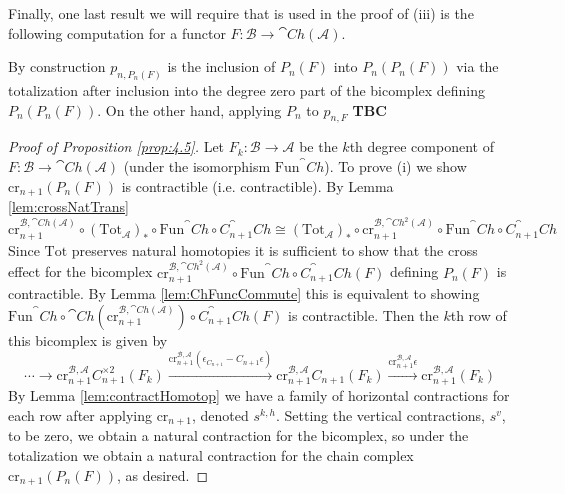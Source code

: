 Finally, one last result we will require that is used in the proof of (iii) is the following computation for a functor $F:\mathcal{B}\rightarrow \cat{Ch}(\mathcal{A})$.

\begin{rmk}
    By construction $p_{n,P_n(F)}$ is the inclusion of $P_n(F)$ into $P_n(P_n(F))$ via the totalization after inclusion into the degree zero part of the bicomplex defining $P_n(P_n(F))$. On the other hand, applying $P_n$ to $p_{n,F}$ \textbf{TBC}
\end{rmk}

\begin{proof}[Proof of Proposition \ref{prop:4.5}]
    Let $F_k:\mathcal{B}\rightarrow \mathcal{A}$ be the $k$th degree component of $F:\mathcal{B}\rightarrow \cat{Ch}(\mathcal{A})$ (under the isomorphism $\text{Fun}^\cat{Ch}$). To prove (i) we show $\text{cr}_{n+1}(P_n(F))$ is contractible (i.e.  contractible). By Lemma \ref{lem:crossNatTrans} 
    \begin{equation*}
        \text{cr}_{n+1}^{\mathcal{B},\cat{Ch}(\mathcal{A})}\circ (\text{Tot}_\mathcal{A})_*\circ \text{Fun}^\cat{Ch}\circ C_{n+1}^\cat{Ch} \cong (\text{Tot}_\mathcal{A})_*\circ \text{cr}_{n+1}^{\mathcal{B},\cat{Ch}^2(\mathcal{A})}\circ \text{Fun}^\cat{Ch}\circ C_{n+1}^\cat{Ch}
    \end{equation*}
    Since $\text{Tot}$ preserves natural homotopies it is sufficient to show that the cross effect for the bicomplex $\text{cr}_{n+1}^{\mathcal{B},\cat{Ch}^2(\mathcal{A})}\circ \text{Fun}^\cat{Ch}\circ C_{n+1}^\cat{Ch}(F)$ defining $P_n(F)$ is contractible. By Lemma \ref{lem:ChFuncCommute} this is equivalent to showing $\text{Fun}^\cat{Ch}\circ\cat{Ch}(\text{cr}_{n+1}^{\mathcal{B},\cat{Ch}(\mathcal{A})})\circ C_{n+1}^\cat{Ch}(F)$ is contractible. Then the $k$th row of this bicomplex is given by
    \begin{equation*}
        \cdots \rightarrow\text{cr}_{n+1}^{\mathcal{B},\mathcal{A}}C_{n+1}^{\times2}(F_k)\xrightarrow{\text{cr}_{n+1}^{\mathcal{B},\mathcal{A}}(\epsilon_{C_{n+1}}-C_{n+1}\epsilon)}\text{cr}_{n+1}^{\mathcal{B},\mathcal{A}}C_{n+1}(F_k)\xrightarrow{\text{cr}_{n+1}^{\mathcal{B},\mathcal{A}}\epsilon}\text{cr}_{n+1}^{\mathcal{B},\mathcal{A}}(F_k)
    \end{equation*}
    By Lemma \ref{lem:contractHomotop} we have a family of horizontal contractions for each row after applying $\text{cr}_{n+1}$, denoted $s^{k,h}$. Setting the vertical contractions, $s^v$, to be zero, we obtain a natural contraction for the bicomplex, so under the totalization we obtain a natural contraction for the chain complex $\text{cr}_{n+1}(P_n(F))$, as desired. 


\end{proof}

